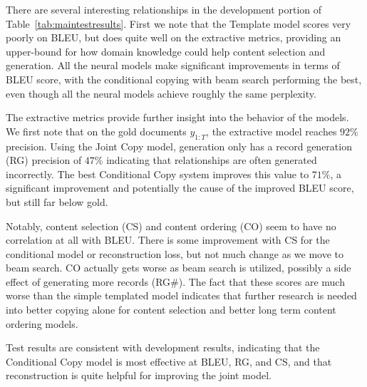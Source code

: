 \documentclass[11pt,letterpaper]{article}
\begin{document}
There are several interesting relationships in the development portion of Table~\ref{tab:maintestresults}.
First we note that the Template model scores very poorly on BLEU, but
does quite well on the extractive metrics, providing an upper-bound
for how domain knowledge could help content selection and
generation. All the neural models make significant improvements in terms
of BLEU score, with the conditional copying with beam search
performing the best, even though all the neural models achieve roughly
the same perplexity.

The extractive metrics provide further insight into the behavior of
the models. We first note that on the gold documents $y_{1:T}$, the extractive model reaches
$92\%$ precision. Using the Joint Copy model, generation only
has a record generation (RG) precision of $47\%$ indicating that
relationships are often generated incorrectly. The best Conditional
Copy system improves this value to $71\%$, a significant improvement
and potentially the cause of the improved BLEU score, but still far below
gold. 

Notably, content selection (CS) and content ordering (CO) seem to have
no correlation at all with BLEU. There is some improvement with CS for
the conditional model or reconstruction loss, but not much change as
we move to beam search. CO actually gets worse as beam search is
utilized, possibly a side effect of generating more records (RG\#). 
The fact that these scores are much worse than the simple templated model
indicates that further research is needed into better copying alone for 
content selection and better long term content ordering models. 

Test results are consistent with development results, indicating that the Conditional Copy model is most 
effective at BLEU, RG, and CS, and that reconstruction is quite helpful for 
improving the joint model. 
 
 
 
\end{document}
